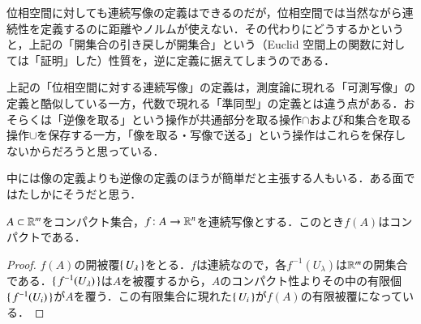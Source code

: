 \begin{dig}
位相空間に対しても連続写像の定義はできるのだが，位相空間では当然ながら連続性を定義するのに距離やノルムが使えない．その代わりにどうするかというと，上記の「開集合の引き戻しが開集合」という（Euclid 空間上の関数に対しては「証明」した）性質を，逆に定義に据えてしまうのである．
\end{dig}

\begin{dig}
上記の「位相空間に対する連続写像」の定義は，測度論に現れる「可測写像」の定義と酷似している一方，代数で現れる「準同型」の定義とは違う点がある．おそらくは「逆像を取る」という操作が共通部分を取る操作$\cap$および和集合を取る操作$\cup$を保存する一方，「像を取る・写像で送る」という操作はこれらを保存しないからだろうと思っている．
\end{dig}

\begin{dig}
中には像の定義よりも逆像の定義のほうが簡単だと主張する人もいる．ある面ではたしかにそうだと思う．
\end{dig}

\begin{lem}
$A \subset \mathbb{R}^m$をコンパクト集合，$f \colon A \to \mathbb{R}^n$を連続写像とする．このとき$f(A)$はコンパクトである．
\end{lem}

\begin{proof}
$f(A)$の開被覆$\set{U_\lambda}$をとる．$f$は連続なので，各$f^{-1}(U_\lambda)$は$\mathbb{R}^m$の開集合である．$\set{f^{-1}(U_\lambda)}$は$A$を被覆するから，$A$のコンパクト性よりその中の有限個$\set{f^{-1}(U_i)}$が$A$を覆う．この有限集合に現れた$\set{U_i}$が$f(A)$の有限被覆になっている．
\end{proof}\
